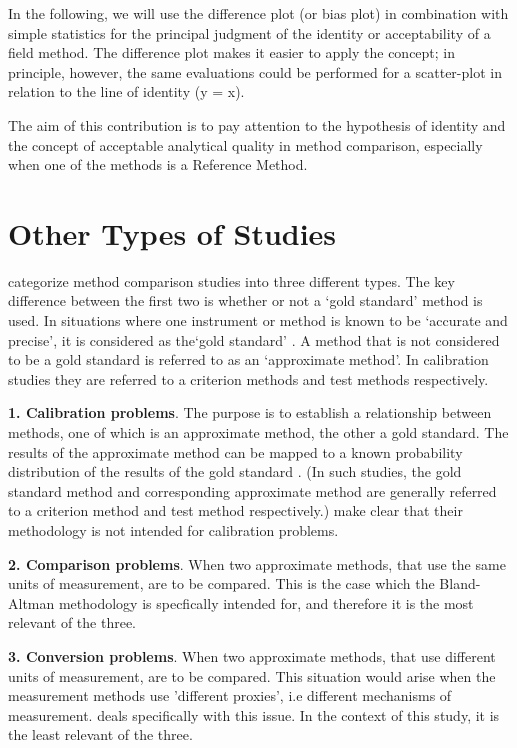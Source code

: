 \documentclass[12pt, a4paper]{report}
\theoremstyle{plain}
\theoremstyle{definition}
\theoremstyle{remark}
\begin{document}
In the following, we will use the difference plot (or bias plot) in combination with simple statistics for the principal judgment of the identity or acceptability of a field method. The difference plot makes it easier to apply the concept; in principle, however, the same evaluations could be performed for a scatter-plot in relation to the line of identity (y = x).

The aim of this contribution is to pay attention to the hypothesis of identity and the concept of acceptable analytical quality in method comparison, especially when one of the methods is a Reference Method.
	
	



\section{Other Types of Studies}
\citet{lewis} categorize method comparison studies into three
different types.  The key difference between the first two is
whether or not a `gold standard' method is used. In situations
where one instrument or method is known to be `accurate and
precise', it is considered as the`gold standard' \citep{lewis}. A
method that is not considered to be a gold standard is referred to
as an `approximate method'. In calibration studies they are
referred to a criterion methods and test methods respectively.


\textbf{1. Calibration problems}. The purpose is to establish a
relationship between methods, one of which is an approximate
method, the other a gold standard. The results of the approximate
method can be mapped to a known probability distribution of the
results of the gold standard \citep{lewis}. (In such studies, the
gold standard method and corresponding approximate method are
generally referred to a criterion method and test method
respectively.) \citet*{BA83} make clear that their methodology is
not intended for calibration problems.

\bigskip \textbf{2. Comparison problems}. When two approximate
methods, that use the same units of measurement, are to be
compared. This is the case which the Bland-Altman methodology is
specfically intended for, and therefore it is the most relevant of
the three.



\bigskip \textbf{3. Conversion problems}. When two approximate
methods, that use different units of measurement, are to be
compared. This situation would arise when the measurement methods
use 'different proxies', i.e different mechanisms of measurement.
\citet{lewis} deals specifically with this issue. In the context
of this study, it is the least relevant of the three.
\end{document}
